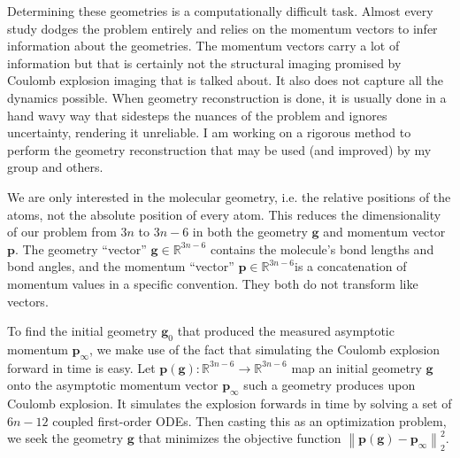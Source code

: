 Determining these geometries is a computationally difficult task. Almost every study dodges the problem entirely and relies on the momentum vectors to infer information about the geometries. The momentum vectors carry a lot of information but that is certainly not the structural imaging promised by Coulomb explosion imaging that is talked about. It also does not capture all the dynamics possible. When geometry reconstruction is done, it is usually done in a hand wavy way that sidesteps the nuances of the problem and ignores uncertainty, rendering it unreliable. I am working on a rigorous method to perform the geometry reconstruction that may be used (and improved) by my group and others.

We are only interested in the molecular geometry, i.e. the relative positions of the atoms, not the absolute position of every atom. This reduces the dimensionality of our problem from $3n$ to $3n-6$ in both the geometry $\mathbf{g}$ and momentum vector $\mathbf{p}$. The geometry ``vector'' $\mathbf{g} \in \mathbb{R}^{3n-6}$ contains the molecule's bond lengths and bond angles, and the momentum ``vector'' $\mathbf{p} \in \mathbb{R}^{3n-6}$is a concatenation of momentum values in a specific convention. They both do not transform like vectors.

To find the initial geometry $\mathbf{g}_0$ that produced the measured asymptotic momentum $\mathbf{p}_\infty$, we make use of the fact that simulating the Coulomb explosion forward in time is easy. Let $\mathbf{p}(\mathbf{g}) : \mathbb{R}^{3n-6} \rightarrow \mathbb{R}^{3n-6}$ map an initial geometry $\mathbf{g}$ onto the asymptotic momentum vector $\mathbf{p}_\infty$ such a geometry produces upon Coulomb explosion. It simulates the explosion forwards in time by solving a set of $6n-12$ coupled first-order ODEs. Then casting this as an optimization problem, we seek the geometry $\mathbf{g}$ that minimizes the objective function $\left\| \mathbf{p}(\mathbf{g}) - \mathbf{p}_\infty \right\|_2^2$.